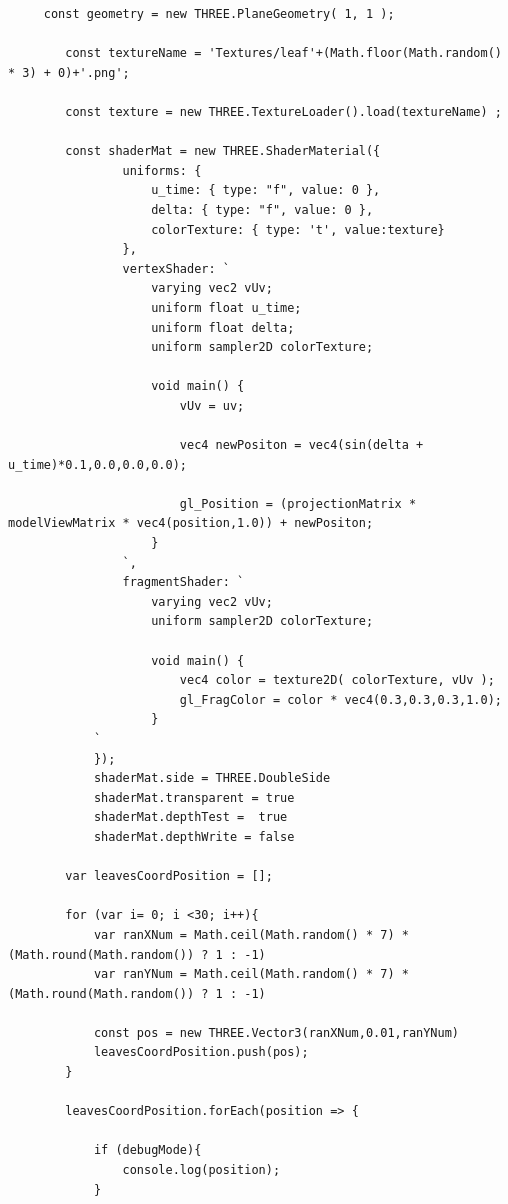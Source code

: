 \documentclass[10pt,a4paper]{article}
\begin{document}
\begin{verbatim}
     const geometry = new THREE.PlaneGeometry( 1, 1 );
    
        const textureName = 'Textures/leaf'+(Math.floor(Math.random() * 3) + 0)+'.png';

        const texture = new THREE.TextureLoader().load(textureName) ;

        const shaderMat = new THREE.ShaderMaterial({
                uniforms: {
                    u_time: { type: "f", value: 0 },
                    delta: { type: "f", value: 0 },
                    colorTexture: { type: 't', value:texture}
                },
                vertexShader: `
                    varying vec2 vUv;
                    uniform float u_time;
                    uniform float delta;
                    uniform sampler2D colorTexture;

                    void main() {
                        vUv = uv;

                        vec4 newPositon = vec4(sin(delta + u_time)*0.1,0.0,0.0,0.0);

                        gl_Position = (projectionMatrix * modelViewMatrix * vec4(position,1.0)) + newPositon;
                    }
                `,
                fragmentShader: `
                    varying vec2 vUv;
                    uniform sampler2D colorTexture;

                    void main() {
                        vec4 color = texture2D( colorTexture, vUv );
                        gl_FragColor = color * vec4(0.3,0.3,0.3,1.0);
                    }
            `
            });
            shaderMat.side = THREE.DoubleSide
            shaderMat.transparent = true
            shaderMat.depthTest =  true
            shaderMat.depthWrite = false
        
        var leavesCoordPosition = [];

        for (var i= 0; i <30; i++){
            var ranXNum = Math.ceil(Math.random() * 7) * (Math.round(Math.random()) ? 1 : -1)
            var ranYNum = Math.ceil(Math.random() * 7) * (Math.round(Math.random()) ? 1 : -1)

            const pos = new THREE.Vector3(ranXNum,0.01,ranYNum)
            leavesCoordPosition.push(pos);     
        }
    
        leavesCoordPosition.forEach(position => {

            if (debugMode){
                console.log(position);
            }
       

\end{verbatim}
\end{document}
